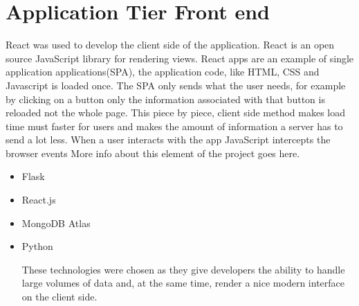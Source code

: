 \section{Application Tier Front end}
React was used to develop the client side of the application. React is an open source JavaScript library for rendering views. React apps are an example of single application applications(SPA), the application code, like HTML, CSS and Javascript is loaded once. The SPA only sends what the user needs, for example by clicking on a button only the information associated with that button is reloaded not the whole page. This piece by piece, client side method makes load time must faster for users and makes the amount of information a server has to send a lot less.
When a user interacts with the app JavaScript intercepts the browser events
More info about this element of the project goes here.

\begin{itemize}
\item Flask
\item React.js
\item MongoDB Atlas
\item Python


These technologies were chosen as they give developers the ability to handle large volumes of data and, at the same time, render a nice modern interface on the client side.

\end{itemize}

